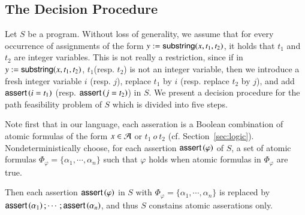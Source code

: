 \subsection{The Decision Procedure}
%
Let $S$  be a {\slint} program. %
Without loss of generality, we assume that for every occurrence of assignments of the form $y:= \mathsf{substring}(x, t_1, t_2)$, it holds that $t_1$ and $t_2$ are integer variables. This is not really a restriction, since if in $y:= \mathsf{substring}(x, t_1, t_2)$, $t_1$(resp. $t_2$) is not an integer variable, then we introduce a fresh integer variable $i$ (resp. $j$), replace $t_1$ by $i$ (resp. replace $t_2$ by $j$), and add $\textsf{assert}\left(i=t_1\right)$ (resp. $\textsf{assert}\left(j = t_2\right)$) in $S$.
We present a decision procedure for the path feasibility problem of $S$ which is divided into five steps. %
%

\medskip
{}%

\smallskip
Note first that in our language, each asseration is a Boolean combination of atomic formulas of the form $x\in \mathcal{A}$ or $t_1\ o\ t_2$ (cf. Section~\ref{sec:logic}).  
Nondeterministically choose, for each assertion $\textsf{assert}\left(\varphi\right)$ of $S$, a set of atomic formulas $\Phi_\varphi = \{\alpha_1,\cdots,\alpha_n\}$ such that $\varphi$ holds when atomic formulas in $\Phi_\varphi$ are true.  %

Then each assertion $\textsf{assert}\left(\varphi\right)$ in $S$ with $\Phi_\varphi = \{\alpha_1,\cdots,\alpha_n\}$ is replaced by $\textsf{assert}\left(\alpha_1\right); \cdots; \textsf{assert}\left(\alpha_n\right)$, and thus $S$ constains atomic asserations only. 

\medskip 
{}%

\smallskip


